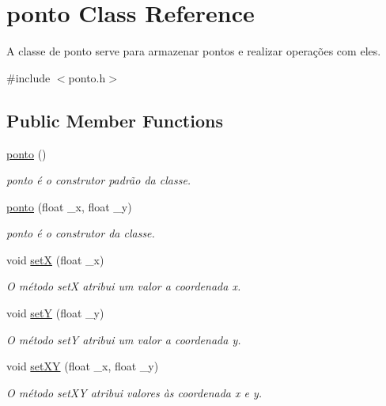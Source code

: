 \hypertarget{classponto}{}\section{ponto Class Reference}
\label{classponto}


A classe de ponto serve para armazenar pontos e realizar operações com eles.  




{\ttfamily \#include $<$ponto.\+h$>$}

\subsection*{Public Member Functions}
\begin{DoxyCompactItemize}
\item 
\hyperlink{classponto_a0ac1f12232a221c3d283e27b2e367d0d}{ponto} ()
\begin{DoxyCompactList}\small\item\em ponto é o construtor padrão da classe. \end{DoxyCompactList}\item 
\hyperlink{classponto_a6d6d40e6c14e903c65c48988b65fb649}{ponto} (float \+\_\+x, float \+\_\+y)
\begin{DoxyCompactList}\small\item\em ponto é o construtor da classe. \end{DoxyCompactList}\item 
void \hyperlink{classponto_a64ff8ce435f3626995f535671a21403d}{setX} (float \+\_\+x)
\begin{DoxyCompactList}\small\item\em O método setX atribui um valor a coordenada x. \end{DoxyCompactList}\item 
void \hyperlink{classponto_acf9918cb8a31b1f74e7425acee366322}{setY} (float \+\_\+y)
\begin{DoxyCompactList}\small\item\em O método setY atribui um valor a coordenada y. \end{DoxyCompactList}\item 
void \hyperlink{classponto_a29ac118d16c126d9d13ae8daff2f13cf}{set\+XY} (float \+\_\+x, float \+\_\+y)
\begin{DoxyCompactList}\small\item\em O método set\+XY atribui valores às coordenada x e y. \end{DoxyCompactList}\item 

\end{DoxyCompactItemize}
